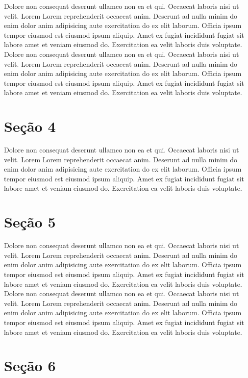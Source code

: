 \documentclass[12pt]{report}
\begin{document}
Dolore non consequat deserunt ullamco non ea et qui. Occaecat laboris nisi ut velit. Lorem Lorem reprehenderit occaecat anim. Deserunt ad nulla minim do enim dolor anim adipisicing aute exercitation do ex elit laborum. Officia ipsum tempor eiusmod est eiusmod ipsum aliquip. Amet ex fugiat incididunt fugiat sit labore amet et veniam eiusmod do. Exercitation ea velit laboris duis voluptate.
Dolore non consequat deserunt ullamco non ea et qui. Occaecat laboris nisi ut velit. Lorem Lorem reprehenderit occaecat anim. Deserunt ad nulla minim do enim dolor anim adipisicing aute exercitation do ex elit laborum. Officia ipsum tempor eiusmod est eiusmod ipsum aliquip. Amet ex fugiat incididunt fugiat sit labore amet et veniam eiusmod do. Exercitation ea velit laboris duis voluptate.


\section{Seção 4}

Dolore non consequat deserunt ullamco non ea et qui. Occaecat laboris nisi ut velit. Lorem Lorem reprehenderit occaecat anim. Deserunt ad nulla minim do enim dolor anim adipisicing aute exercitation do ex elit laborum. Officia ipsum tempor eiusmod est eiusmod ipsum aliquip. Amet ex fugiat incididunt fugiat sit labore amet et veniam eiusmod do. Exercitation ea velit laboris duis voluptate.

\section{Seção 5}

Dolore non consequat deserunt ullamco non ea et qui. Occaecat laboris nisi ut velit. Lorem Lorem reprehenderit occaecat anim. Deserunt ad nulla minim do enim dolor anim adipisicing aute exercitation do ex elit laborum. Officia ipsum tempor eiusmod est eiusmod ipsum aliquip. Amet ex fugiat incididunt fugiat sit labore amet et veniam eiusmod do. Exercitation ea velit laboris duis voluptate.
Dolore non consequat deserunt ullamco non ea et qui. Occaecat laboris nisi ut velit. Lorem Lorem reprehenderit occaecat anim. Deserunt ad nulla minim do enim dolor anim adipisicing aute exercitation do ex elit laborum. Officia ipsum tempor eiusmod est eiusmod ipsum aliquip. Amet ex fugiat incididunt fugiat sit labore amet et veniam eiusmod do. Exercitation ea velit laboris duis voluptate.

\section{Seção 6}
\end{document}
